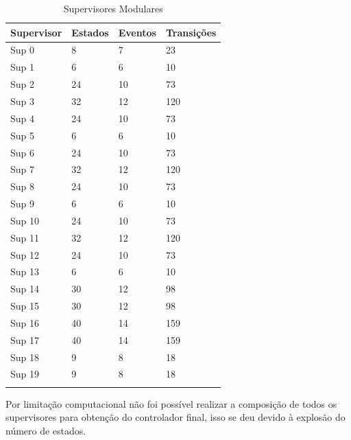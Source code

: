 \begin{table}[h]%
\begin{center}
\begin{minipage}{0.5\textwidth}
\caption{Supervisores Modulares}
\label{tab:supervisor}
\begin{tabular}{@{}llll@{}}
  \toprule
  Supervisor & Estados & Eventos & Transições\\
  \midrule
  Sup 0 & 8 & 7 & 23\\
  Sup 1 & 6 & 6 & 10\\
  Sup 2 & 24 & 10 & 73\\
  Sup 3 & 32 & 12 & 120\\
  Sup 4 & 24 & 10 & 73\\
  Sup 5 & 6 & 6 & 10\\
  Sup 6 & 24 & 10 & 73\\
  Sup 7 & 32 & 12 & 120\\
  Sup 8 & 24 & 10 & 73\\
  Sup 9 & 6 & 6 & 10\\
  Sup 10 & 24 & 10 & 73\\
  Sup 11 & 32 & 12 & 120\\
  Sup 12 & 24 & 10 & 73\\
  Sup 13 & 6 & 6 & 10\\
  Sup 14 & 30 & 12 & 98\\
  Sup 15 & 30 & 12 & 98\\
  Sup 16 & 40 & 14 & 159\\
  Sup 17 & 40 & 14 & 159\\
  Sup 18 & 9 & 8 & 18\\
  Sup 19 & 9 & 8 & 18\\
  \botrule
\end{tabular}
\end{minipage}
\end{center}
\end{table}

\newpage

Por limitação computacional não foi possível realizar a composição de todos os supervisores para obtenção do controlador final, isso se deu devido à explosão do número de estados.
